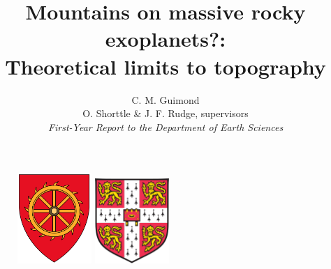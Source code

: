 \documentclass[10pt,a4paper]{article}
\author{C. M. Guimond \\ \normalsize O. Shorttle \& J. F. Rudge, supervisors \\ \textit{First-Year Report to the Department of Earth Sciences}}
\title{Mountains on massive rocky exoplanets?: \\ \large Theoretical limits to topography}
\begin{document}
\begin{figure}
    \centering
    \begin{minipage}{0.5\textwidth}
        \centering
        \includegraphics[width=0.25\textwidth]{cats} %
    \end{minipage}\hfill
    \begin{minipage}{0.5\textwidth}
        \centering
        \includegraphics[width=0.25\textwidth]{cam} %
    \end{minipage}
\end{figure}

\maketitle




\tableofcontents








\setcounter{equation}{0}
\renewcommand{\theequation}{A\arabic{equation}}
\setcounter{table}{0}
\renewcommand{\thetable}{A\arabic{table}}
\begin{appendices}


\end{appendices}
\end{document}
